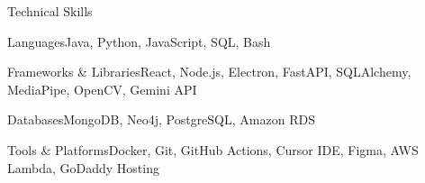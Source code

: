\documentclass[
	11pt
]{resume}
\begin{document}
	\begin{rSection}{T}{echnical Skills}
		\begin{rSet}{Languages}{Java, Python, JavaScript, SQL, Bash}
		\end{rSet}
		\begin{rSet}{Frameworks \& Libraries}{React, Node.js, Electron, FastAPI, SQLAlchemy, MediaPipe, OpenCV, Gemini API}
		\end{rSet}
		\begin{rSet}{Databases}{MongoDB, Neo4j, PostgreSQL, Amazon RDS}
		\end{rSet}
		\begin{rSet}{Tools \& Platforms}{Docker, Git, GitHub Actions, Cursor IDE, Figma, AWS Lambda, GoDaddy Hosting}
		\end{rSet}
	\end{rSection}
\end{document}
